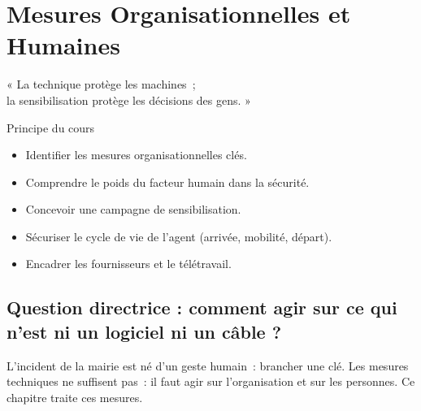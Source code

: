 
\chapter{Mesures Organisationnelles et Humaines}
\label{chap:orga}

\epigraph{%
    « La technique protège les machines~;\\
    la sensibilisation protège les décisions des gens. »%
}{Principe du cours}


\begin{boxobjectifs}
\begin{itemize}
    \item Identifier les mesures organisationnelles clés.
    \item Comprendre le poids du facteur humain dans la sécurité.
    \item Concevoir une campagne de sensibilisation.
    \item Sécuriser le cycle de vie de l'agent (arrivée, mobilité, départ).
    \item Encadrer les fournisseurs et le télétravail.
\end{itemize}
\end{boxobjectifs}

\bigskip

\section*{Question directrice : comment agir sur ce qui n'est ni un logiciel ni un câble ?}

L'incident de la mairie est né d'un geste humain~: brancher une clé. Les
mesures techniques ne suffisent pas~: il faut agir sur l'organisation et sur les
personnes. Ce chapitre traite ces mesures.

